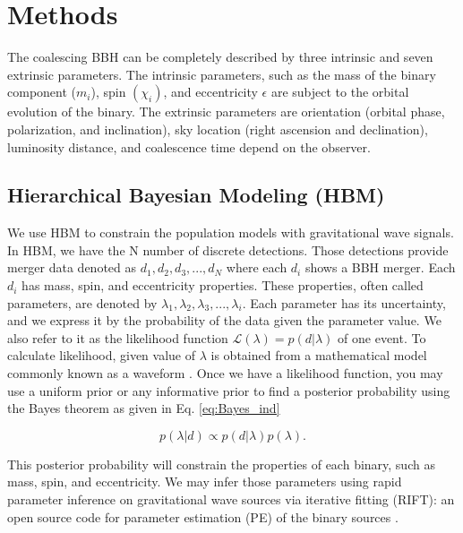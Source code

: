 \documentclass[twocolumn,prd,nofootinbib]{revtex4}
\begin{document}
\section{Methods}
\label{sec:methods}

The coalescing BBH can be completely described by three intrinsic and seven extrinsic parameters. The intrinsic parameters, such as the mass of the binary component ($m_i$), spin $( \chi_i)$, and eccentricity $\epsilon$  are subject to the orbital evolution of the binary. The extrinsic parameters are orientation (orbital phase, polarization, and inclination), sky location (right ascension and declination), luminosity distance, and coalescence time depend on the observer.



\subsection{Hierarchical Bayesian Modeling (HBM)}


We use HBM to constrain the population models with gravitational wave signals. In HBM, we have the N number of discrete detections. Those detections provide merger data denoted as $d_1,d_2,d_3,...,d_N$ where each $d_i$ shows a BBH merger. Each $d_i$ has mass, spin, and eccentricity properties. These properties, often called parameters, are denoted by $\lambda_1,\lambda_2,\lambda_3,...,\lambda_i$. Each parameter has its uncertainty, and we express it by the probability of the data given the parameter value. We also refer to it as the likelihood function $\mathcal{L}(\lambda)=p(d|\lambda)$ of one event. To calculate likelihood, given value of $\lambda$ is obtained from a mathematical model commonly known as a waveform . Once we have a likelihood function, you may use a uniform prior or any informative prior to find a posterior probability using the Bayes theorem as given in Eq. \ref{eq:Bayes_ind}

\begin{equation}
\label{eq:Bayes_ind}    
p(\lambda|d) \propto p(d|\lambda) p(\lambda).
\end{equation}

This posterior probability will constrain the properties of each binary, such as mass, spin, and eccentricity. We may infer those parameters using rapid parameter inference on gravitational wave sources via iterative fitting (RIFT): an open source code for parameter estimation (PE) of the binary sources \cite{rift_2018}.
\end{document}
